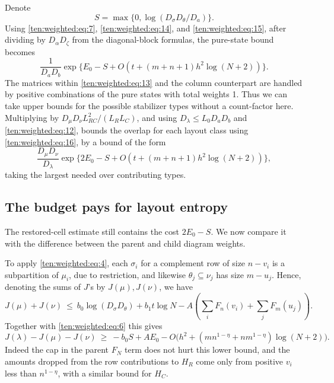Denote
\[
 S=\max\{0,\log(D_\sigma D_\theta/D_a)\}.
\]
Using \eqref{ten:weighted:eq:7}, \eqref{ten:weighted:eq:14}, and \eqref{ten:weighted:eq:15}, after dividing by \(D_\alpha D_\zeta\) from the diagonal-block formulas, the pure-state bound becomes
\begin{equation}
 \frac{1}{D_aD_b}
 \exp\{E_0-S+O(t+(m+n+1)h^2\log(N+2))\}.                                                  \label{ten:weighted:eq:16}
\end{equation}
The matrices within \eqref{ten:weighted:eq:13} and the column counterpart are handled by positive combinations of the pure states with total weights 1. Thus we can take upper bounds for the possible stabilizer types without a count-factor here. Multiplying by \(D_\mu D_\nu L_{RC}^2/(L_R L_C)\), and using \(D_\lambda\le L_0 D_a D_b\) and \eqref{ten:weighted:eq:12}, bounds the overlap for each layout class using \eqref{ten:weighted:eq:16}, by a bound of the form
\begin{equation}
 \frac{D_\mu D_\nu}{D_\lambda}
 \exp\{2E_0-S+O(t+(m+n+1)h^2\log(N+2))\},                                                 \label{ten:weighted:eq:17}
\end{equation}
taking the largest needed over contributing types.


\subsection{The budget pays for layout entropy}
\label{ten:weighted:part:234}
The restored-cell estimate still contains the cost \(2E_0-S\). We now compare it with the difference between the parent and child diagram weights.

To apply \eqref{ten:weighted:eq:4}, each \(\sigma_i\) for a complement row of size \(n-v_i\) is a subpartition of \(\mu_i\), due to restriction, and likewise \(\theta_j\subseteq\nu_j\) has size \(m-u_j\). Hence, denoting the sums of \(J\)'s by \(J(\mu),J(\nu)\), we have
\[
 J(\mu)+J(\nu)\ \le\
 b_0\log(D_\sigma D_\theta)+b_1 t\log N
 -A\left(\sum_i F_n(v_i)+\sum_j F_m(u_j)\right).
\]
Together with \eqref{ten:weighted:eq:6} this gives
\begin{equation}
 J(\lambda)-J(\mu)-J(\nu)
 \ \ge\ -b_0 S + A E_0 -O\big(h^2+(m n^{1-\eta}+n m^{1-\eta})\log(N+2)\big).               \label{ten:weighted:eq:18}
\end{equation}
Indeed the cap in the parent \(F_N\) term does not hurt this lower bound, and the amounts dropped from the row contributions to \(H_R\) come only from positive \(v_i\) less than \(n^{1-\eta}\), with a similar bound for \(H_C\).

